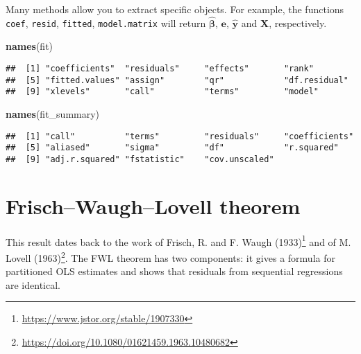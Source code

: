 \documentclass[]{book}
\newenvironment{Shaded}{\begin{snugshade}}{\end{snugshade}}
\newcommand{\KeywordTok}[1]{\textcolor[rgb]{0.13,0.29,0.53}{\textbf{#1}}}
\newcommand{\NormalTok}[1]{#1}
\let\rmarkdownfootnote\footnote%
\def\footnote{\protect\rmarkdownfootnote}
\renewcommand{\href}[2]{#2\footnote{\url{#1}}}
\theoremstyle{definition}
\theoremstyle{definition}
\theoremstyle{definition}
\theoremstyle{remark}
\begin{document}
Many methods allow you to extract specific objects. For example, the
functions \texttt{coef}, \texttt{resid}, \texttt{fitted},
\texttt{model.matrix} will return \(\hat{\boldsymbol{\beta}}\),
\(\boldsymbol{e}\), \(\hat{\boldsymbol{y}}\) and \(\mathbf{X}\),
respectively.

\begin{Shaded}
\begin{Highlighting}[]
\KeywordTok{names}\NormalTok{(fit)}
\end{Highlighting}
\end{Shaded}

\begin{verbatim}
##  [1] "coefficients"  "residuals"     "effects"       "rank"         
##  [5] "fitted.values" "assign"        "qr"            "df.residual"  
##  [9] "xlevels"       "call"          "terms"         "model"
\end{verbatim}

\begin{Shaded}
\begin{Highlighting}[]
\KeywordTok{names}\NormalTok{(fit_summary)}
\end{Highlighting}
\end{Shaded}

\begin{verbatim}
##  [1] "call"          "terms"         "residuals"     "coefficients" 
##  [5] "aliased"       "sigma"         "df"            "r.squared"    
##  [9] "adj.r.squared" "fstatistic"    "cov.unscaled"
\end{verbatim}

\chapter{Frisch--Waugh--Lovell theorem}\label{frischwaughlovell-theorem}

\newcommand{\bs}[1]{\boldsymbol{#1}}
\newcommand{\Hmat}{\mathbf{H}}
\newcommand{\Mmat}{\mathbf{M}}
\newcommand{\mX}{\mathbf{X}}
\newcommand{\bX}{{\mathbf{X}}}
\newcommand{\bx}{{\mathbf{x}}}
\newcommand{\by}{{\boldsymbol{y}}}
\newcommand{\bY}{{\boldsymbol{Y}}}
\newcommand{\eps}{\varepsilon}
\newcommand{\beps}{\boldsymbol{\varepsilon}}
\newcommand{\bbeta}{\boldsymbol{\beta}}
\newcommand{\hbb}{\widehat{\boldsymbol{\beta}}}
\newcommand{\limni}{\lim_{n \ra \infty}}
\newcommand{\Sp}{\mathsf{span}}

This result dates back to the work of
\href{https://www.jstor.org/stable/1907330}{Frisch, R. and F. Waugh
(1933)} and of \href{https://doi.org/10.1080/01621459.1963.10480682}{M.
Lovell (1963)}. The FWL theorem has two components: it gives a formula
for partitioned OLS estimates and shows that residuals from sequential
regressions are identical.
\end{document}
